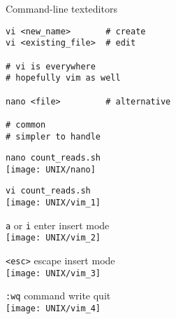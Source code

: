 \documentclass[xcolor=dvipsnames]{beamer}
\begin{document}
\begin{frame}[fragile]
	\begin{center}
		\Huge
		Command-line texteditors
	\end{center}
	\Large
\begin{verbatim}
vi <new_name>       # create
vi <existing_file>  # edit

# vi is everywhere
# hopefully vim as well

nano <file>         # alternative

# common
# simpler to handle
\end{verbatim}
\end{frame}

\begin{frame}[fragile]
	\begin{center}
		\Large
		\verb!nano count_reads.sh! \\
		\vspace{1cm}
		\texttt{[image: UNIX/nano]}
	\end{center}
\end{frame}

\begin{frame}[fragile]
	\begin{center}
		\Large
		\verb!vi count_reads.sh! \\
		\vspace{1cm}
		\texttt{[image: UNIX/vim\_1]}
	\end{center}
\end{frame}

\begin{frame}[fragile]
	\begin{center}
		\Large
		\verb!a! or \verb!i! enter insert mode \\
		\vspace{1cm}
		\texttt{[image: UNIX/vim\_2]}
	\end{center}
\end{frame}

\begin{frame}[fragile]
	\begin{center}
		\Large
		\verb!<esc>! escape insert mode\\
		\vspace{1cm}
		\texttt{[image: UNIX/vim\_3]}
	\end{center}
\end{frame}

\begin{frame}[fragile]
	\begin{center}
		\Large
		\verb!:wq! command write quit\\
		\vspace{1cm}
		\texttt{[image: UNIX/vim\_4]}
	\end{center}
\end{frame}
\end{document}
